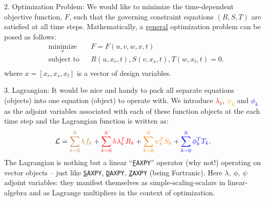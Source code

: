\documentclass{beamer}
\newenvironment{noheadline}{
    \setbeamertemplate{headline}{}
    \addtobeamertemplate{frametitle}{\vspace*{-1.5\baselineskip}}{}
}{}
\begin{document}
\begin{noheadline}
\begin{frame}[allowframebreaks]
{\begin{block}{2. Optimization Problem:}
  We would like to minimize the time-dependent objective function,
  $F$, such that the governing constraint equations $(R, S, T)$ are
  satisfied at all time steps.  Mathematically, a \underline{general}
  optimization problem can be posed as follows:
  \begin{equation}
    \begin{aligned}
      & \underset{x}{\text{minimize}}
      & & F = F(u, v, w, x,t) \\
      & \text{subject to} & &  R(u, x_r, t), S(v, x_s, t), T(w, x_t, t) = 0.\\
    \end{aligned}
  \end{equation}
  where $x = [x_r, x_s, x_t]$ is a vector of design variables.
\end{block}

\begin{block}{3. Lagrangian:}
  It would be nice and handy to pack all separate equations (objects)
  into one equation (object) to operate with. We introduce
  \textcolor{red}{$\lambda_k$}, \textcolor{orange}{$\psi_k$} and
  \textcolor{blue}{$\phi_k$} as the adjoint variables associated with
  each of these function objects at the each time step and the
  Lagrangian function is written as:
  \begin{equation}\label{eqn:nbg-lagrangian}
    {\cal{L}} = \textcolor{brown}{\sum_{k=0}^N h f_k} + \textcolor{red}{ \sum_{k=0}^N h \lambda_k^T R_k} 
    +  \textcolor{orange}{ \sum_{k=0}^N\psi_k^T S_k} +  \textcolor{blue}{ \sum_{k=0}^N\phi_k^T T_k}.
  \end{equation}
  The Lagrangian is nothing but a linear ``\texttt{\underline{F}AXPY}'' 
  operator  (why not!) operating on vector objects -- just like \texttt{\underline{S}AXPY}, 
  \texttt{\underline{D}AXPY}, \texttt{\underline{Z}AXPY} (being Fortranic).
  Here $\lambda,~\phi,~\psi$ adjoint variables: they
  manifest themselves as simple-scaling-scalars in linear-algebra and
  as Lagrange multipliers in the context of optimization.
\end{block}


\framebreak

}
\end{frame}
\end{noheadline}
\end{document}
